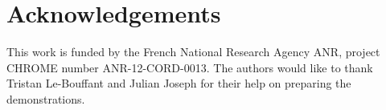 \section*{Acknowledgements}
This work is funded by the French National Research Agency ANR, project CHROME number ANR-12-CORD-0013. The authors would like to thank Tristan Le-Bouffant and Julian Joseph for their help on preparing the demonstrations.